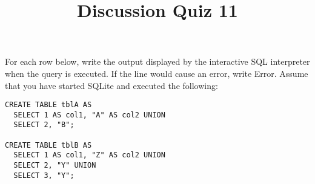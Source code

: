 \documentclass[twoside]{article}
\title{\sc Discussion Quiz 11 \solution{Solutions}}
\begin{document}
\thispagestyle{empty}
\maketitle

\begin{enumerate}

For each row below, write the output displayed by the interactive SQL
interpreter when the query is executed. If the line would cause an error, write {\sc Error}.
Assume that you have started SQLite and executed the following:

\begin{verbatim}
CREATE TABLE tblA AS
  SELECT 1 AS col1, "A" AS col2 UNION
  SELECT 2, "B";

CREATE TABLE tblB AS
  SELECT 1 AS col1, "Z" AS col2 UNION
  SELECT 2, "Y" UNION
  SELECT 3, "Y";
\end{verbatim}


\end{enumerate}
\end{document}
